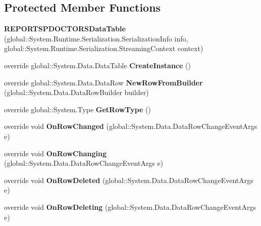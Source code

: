 \subsection*{Protected Member Functions}
\begin{CompactItemize}
\item 
\textbf{REPORTSPDOCTORSDataTable} (global::System.Runtime.Serialization.SerializationInfo info, global::System.Runtime.Serialization.StreamingContext context)\label{class_automatic_medical_system_1_1_data_set1_1_1_r_e_p_o_r_t_s_p_d_o_c_t_o_r_s_data_table_e734a5bd8f76baf8871af5116f3cfd06}

\item 
override global::System.Data.DataTable \textbf{CreateInstance} ()\label{class_automatic_medical_system_1_1_data_set1_1_1_r_e_p_o_r_t_s_p_d_o_c_t_o_r_s_data_table_5c9b1306eda28cfb592eaab618fee273}

\item 
override global::System.Data.DataRow \textbf{NewRowFromBuilder} (global::System.Data.DataRowBuilder builder)\label{class_automatic_medical_system_1_1_data_set1_1_1_r_e_p_o_r_t_s_p_d_o_c_t_o_r_s_data_table_83f653df602b4d881c7dda0a8eece699}

\item 
override global::System.Type \textbf{GetRowType} ()\label{class_automatic_medical_system_1_1_data_set1_1_1_r_e_p_o_r_t_s_p_d_o_c_t_o_r_s_data_table_889195cb56d8f9f1d3cb7be3bdcfd2a5}

\item 
override void \textbf{OnRowChanged} (global::System.Data.DataRowChangeEventArgs e)\label{class_automatic_medical_system_1_1_data_set1_1_1_r_e_p_o_r_t_s_p_d_o_c_t_o_r_s_data_table_93660dc5bb5e2aac28c8b4dde5fdf2f9}

\item 
override void \textbf{OnRowChanging} (global::System.Data.DataRowChangeEventArgs e)\label{class_automatic_medical_system_1_1_data_set1_1_1_r_e_p_o_r_t_s_p_d_o_c_t_o_r_s_data_table_e7f85d9ee0663cab6ce6611c10d301cc}

\item 
override void \textbf{OnRowDeleted} (global::System.Data.DataRowChangeEventArgs e)\label{class_automatic_medical_system_1_1_data_set1_1_1_r_e_p_o_r_t_s_p_d_o_c_t_o_r_s_data_table_abf00b901d0ae82d5b729e74a4b5b70a}

\item 
override void \textbf{OnRowDeleting} (global::System.Data.DataRowChangeEventArgs e)\label{class_automatic_medical_system_1_1_data_set1_1_1_r_e_p_o_r_t_s_p_d_o_c_t_o_r_s_data_table_e8ff696c023b9535256ebf92e30a28de}

\end{CompactItemize}
